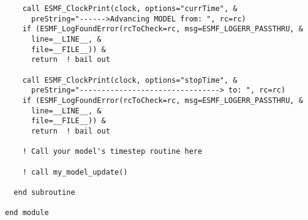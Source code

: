 \begin{verbatim}
    call ESMF_ClockPrint(clock, options="currTime", &
      preString="------>Advancing MODEL from: ", rc=rc)
    if (ESMF_LogFoundError(rcToCheck=rc, msg=ESMF_LOGERR_PASSTHRU, &
      line=__LINE__, &
      file=__FILE__)) &
      return  ! bail out
    
    call ESMF_ClockPrint(clock, options="stopTime", &
      preString="--------------------------------> to: ", rc=rc)
    if (ESMF_LogFoundError(rcToCheck=rc, msg=ESMF_LOGERR_PASSTHRU, &
      line=__LINE__, &
      file=__FILE__)) &
      return  ! bail out

    ! Call your model's timestep routine here
    
    ! call my_model_update()
      
  end subroutine

end module

 
\end{verbatim}

\setlength{\parskip}{\oldparskip}
\setlength{\parindent}{\oldparindent}
\setlength{\baselineskip}{\oldbaselineskip}
